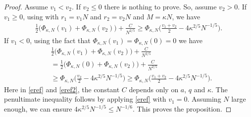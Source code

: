 \documentclass[reqno,11pt]{amsart}
\numberwithin{equation}{section}
\theoremstyle{definition}
\begin{document}
\begin{proof} Assume $v_1<v_2$. If $v_2\le 0$ there is nothing to prove. So, assume $v_2>0$. If $v_1\ge0$, using  with $r_1=v_1N$ and $r_2=v_2N$ and $M=\kappa N$, we have
\begin{align}\label{eref}
\frac12\big(\Phi_{\kappa,N}(v_1)+\Phi_{\kappa,N}(v_2)\big)+\frac{C}{N^{2/5}} \ge \Phi_{\kappa,N}\bigg(\frac{v_1+v_2}{2}-4\kappa^{2/5}N^{-1/5}\bigg).
\end{align}
If $v_1<0$, using the fact that $\Phi_{\kappa,N}(v_1)=\Phi_{\kappa,N}(0)=0$  we have
\begin{equation}\label{eref2}
    \begin{aligned} 
    &\frac12\big(\Phi_{\kappa,N}(v_1)+\Phi_{\kappa,N}(v_2)\big)+\frac{C}{N^{2/5}} \\
    & = \frac12\big(\Phi_{\kappa,N}(0)+\Phi_{\kappa,N}(v_2)\big)+\frac{C}{N^{2/5}} \\ &  \ge \Phi_{\kappa,N}\bigg(\frac{v_2}{2}-4\kappa^{2/5}N^{-1/5}\bigg) \ge \Phi_{\kappa,N}\bigg(\frac{v_1+v_2}{2}-4\kappa^{2/5}N^{-1/5}\bigg).
\end{aligned}
\end{equation}
Here in \eqref{eref} and \eqref{eref2}, the constant $C$ depends only on $a$, $q$ and $\kappa$. The penultimate inequality follows by applying \eqref{eref} with $v_1=0$. Assuming $N$ large enough, we can ensure $4\kappa^{2/5}N^{-1/5} \le N^{-1/6}$. This proves the proposition.
\end{proof}
\end{document}
